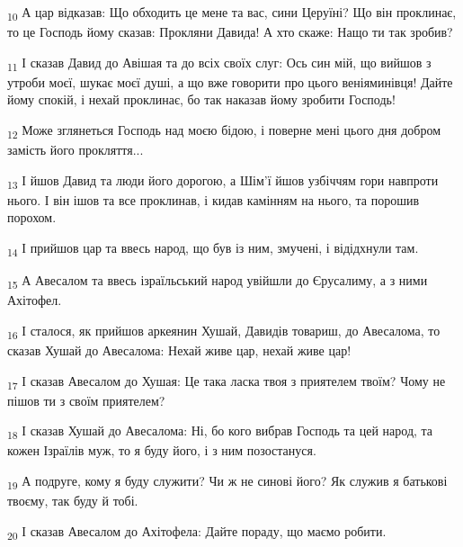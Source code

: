 \begin{tcolorbox}
\textsubscript{10} А цар відказав: Що обходить це мене та вас, сини Церуїні? Що він проклинає, то це Господь йому сказав: Прокляни Давида! А хто скаже: Нащо ти так зробив?
\end{tcolorbox}
\begin{tcolorbox}
\textsubscript{11} І сказав Давид до Авішая та до всіх своїх слуг: Ось син мій, що вийшов з утроби моєї, шукає моєї душі, а що вже говорити про цього веніяминівця! Дайте йому спокій, і нехай проклинає, бо так наказав йому зробити Господь!
\end{tcolorbox}
\begin{tcolorbox}
\textsubscript{12} Може зглянеться Господь над моєю бідою, і поверне мені цього дня добром замість його прокляття...
\end{tcolorbox}
\begin{tcolorbox}
\textsubscript{13} І йшов Давид та люди його дорогою, а Шім'ї йшов узбіччям гори навпроти нього. І він ішов та все проклинав, і кидав камінням на нього, та порошив порохом.
\end{tcolorbox}
\begin{tcolorbox}
\textsubscript{14} І прийшов цар та ввесь народ, що був із ним, змучені, і відідхнули там.
\end{tcolorbox}
\begin{tcolorbox}
\textsubscript{15} А Авесалом та ввесь ізраїльський народ увійшли до Єрусалиму, а з ними Ахітофел.
\end{tcolorbox}
\begin{tcolorbox}
\textsubscript{16} І сталося, як прийшов аркеянин Хушай, Давидів товариш, до Авесалома, то сказав Хушай до Авесалома: Нехай живе цар, нехай живе цар!
\end{tcolorbox}
\begin{tcolorbox}
\textsubscript{17} І сказав Авесалом до Хушая: Це така ласка твоя з приятелем твоїм? Чому не пішов ти з своїм приятелем?
\end{tcolorbox}
\begin{tcolorbox}
\textsubscript{18} І сказав Хушай до Авесалома: Ні, бо кого вибрав Господь та цей народ, та кожен Ізраїлів муж, то я буду його, і з ним позостануся.
\end{tcolorbox}
\begin{tcolorbox}
\textsubscript{19} А подруге, кому я буду служити? Чи ж не синові його? Як служив я батькові твоєму, так буду й тобі.
\end{tcolorbox}
\begin{tcolorbox}
\textsubscript{20} І сказав Авесалом до Ахітофела: Дайте пораду, що маємо робити.
\end{tcolorbox}
